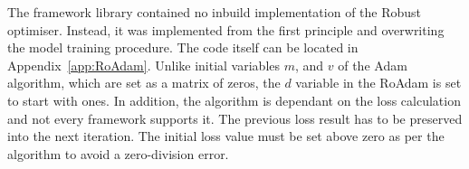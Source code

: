 \begin{table}[htbp]
  \renewcommand{\arraystretch}{1.3}
  \caption{Adam, specific parameters}
  \centering
  \label{tab:adam-params}
\end{table}

%
%
The framework library contained no inbuild implementation of the Robust optimiser.
Instead, it was implemented from the first principle and overwriting the model training procedure.
%
%
{
The code itself can be located in Appendix~\ref{app:RoAdam}.
}
{}
Unlike initial variables $m$, and $v$ of the Adam algorithm, which are set as a matrix of zeros, the $d$ variable in the RoAdam is set to start with ones.
In addition, the algorithm is dependant on the loss calculation and not every framework supports it.
The previous loss result has to be preserved into the next iteration.
The initial loss value must be set above zero as per the algorithm to avoid a zero-division error.